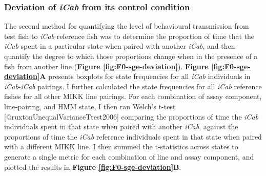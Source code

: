 \documentclass[
]{article}
\begin{document}
\hypertarget{deviation-of-from-its-control-condition}{%
\subsubsection{\texorpdfstring{Deviation of \emph{\textcolor{iCab_424B4D}{iCab}} from its control condition}{Deviation of  from its control condition}}\label{deviation-of-from-its-control-condition}}

The second method for quantifying the level of behavioural transmission from test fish to \emph{\textcolor{iCab_424B4D}{iCab}} reference fish was to determine the proportion of time that the \emph{\textcolor{iCab_424B4D}{iCab}} spent in a particular state when paired with another \emph{\textcolor{iCab_424B4D}{iCab}}, and then quantify the degree to which those proportions change when in the presence of a fish from another line (\textbf{Figure \ref{fig:F0-sge-deviation}}). \textbf{Figure \ref{fig:F0-sge-deviation}A} presents boxplots for state frequencies for all \emph{\textcolor{iCab_424B4D}{iCab}} individuals in \emph{\textcolor{iCab_424B4D}{iCab}}-\emph{\textcolor{iCab_424B4D}{iCab}} pairings. I further calculated the state frequencies for all \emph{\textcolor{iCab_424B4D}{iCab}} reference fishes for all other MIKK line pairings. For each combination of assay component, line-pairing, and HMM state, I then ran Welch's t-test {[}@ruxtonUnequalVarianceTtest2006{]} comparing the proportions of time the \emph{\textcolor{iCab_424B4D}{iCab}} individuals spent in that state when paired with another \emph{\textcolor{iCab_424B4D}{iCab}}, against the proportions of time the \emph{\textcolor{iCab_424B4D}{iCab}} reference individuals spent in that state when paired with a different MIKK line. I then summed the t-statistics across states to generate a single metric for each combination of line and assay component, and plotted the results in \textbf{Figure \ref{fig:F0-sge-deviation}B}.
\end{document}
